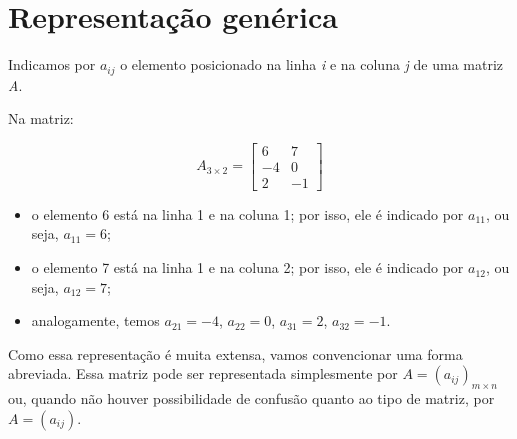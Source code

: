 \section{Representação genérica}

Indicamos por \textbf{$a_{ij}$} o elemento posicionado na linha \textit{i} e na coluna \textit{j} de uma matriz \textit{A}.

Na matriz:

\begin{equation*}
	A_{3 \times 2} = \begin{bmatrix}
		6  & 7  \\
		-4 & 0  \\
		2  & -1
	\end{bmatrix}
\end{equation*}

\begin{itemize}
	\item o elemento 6 está na linha 1 e na coluna 1; por isso, ele é indicado por $a_{11}$, ou seja, $a_{11} = 6$;
	\item o elemento 7 está na linha 1 e na coluna 2; por isso, ele é indicado por $a_{12}$, ou seja, $a_{12} = 7$;
	\item analogamente, temos $a_{21} = -4$, $a_{22} = 0$, $a_{31} = 2$, $a_{32} = -1$.
\end{itemize}

Como essa representação é muita extensa, vamos convencionar uma forma abreviada. Essa matriz pode ser representada simplesmente por
$A = (a_{ij})_{m \times n}$ ou, quando não houver possibilidade de confusão quanto ao tipo de matriz, por $A = (a_{ij})$.

